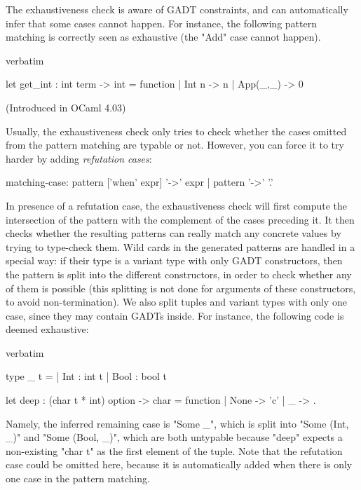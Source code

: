 The exhaustiveness check is aware of GADT constraints, and can
automatically infer that some cases cannot happen.
For instance, the following pattern matching is correctly seen as
exhaustive (the "Add" case cannot happen).
\begin{camlexample}{verbatim}
\begin{caml}
\begin{camlinput}
let get_int : int term -> int = function
  | Int n    -> n
  | App(_,_) -> 0
\end{camlinput}
\end{caml}
\end{camlexample}


 (Introduced in OCaml 4.03)

Usually, the exhaustiveness check only tries to check whether the
cases omitted from the pattern matching are typable or not.
However, you can force it to try harder by adding {\em refutation cases}:
\begin{syntax}
matching-case:
     pattern ['when' expr] '->' expr
   | pattern '->' '.'
\end{syntax}
In presence of a refutation case, the exhaustiveness check will first
compute the intersection of the pattern with the complement of the
cases preceding it. It then checks whether the resulting patterns can
really match any concrete values by trying to type-check them.
Wild cards in the generated patterns are handled in a special way: if
their type is a variant type with only GADT constructors, then the
pattern is split into the different constructors, in order to check whether
any of them is possible (this splitting is not done for arguments of these
constructors, to avoid non-termination). We also split tuples and
variant types with only one case, since they may contain GADTs inside.
For instance, the following code is deemed exhaustive:

\begin{camlexample}{verbatim}
\begin{caml}
\begin{camlinput}
type _ t =
  | Int : int t
  | Bool : bool t

let deep : (char t * int) option -> char = function
  | None -> 'c'
  | _ -> .
\end{camlinput}
\end{caml}
\end{camlexample}

Namely, the inferred remaining case is "Some _", which is split into
"Some (Int, _)" and "Some (Bool, _)", which are both untypable because
"deep" expects a non-existing "char t" as the first element of the tuple.
Note that the refutation case could be omitted here, because it is
automatically added when there is only one case in the pattern
matching.

